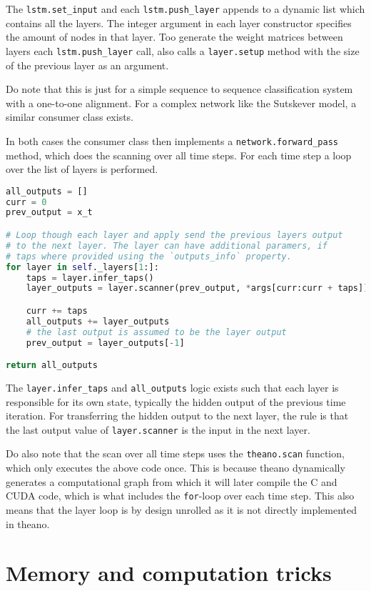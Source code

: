 The \texttt{lstm.set\_input} and each \texttt{lstm.push\_layer} appends to a dynamic list which contains all the layers. The integer argument in each layer constructor specifies the amount of nodes in that layer. Too generate the weight matrices between layers each \texttt{lstm.push\_layer} call, also calls a \texttt{layer.setup} method with the size of the previous layer as an argument.

Do note that this is just for a simple sequence to sequence classification system with a one-to-one alignment. For a complex network like the Sutskever model, a similar consumer class exists.

In both cases the consumer class then implements a \texttt{network.forward\_pass} method, which does the scanning over all time steps. For each time step a loop over the list of layers is performed.
\begin{lstlisting}[language=Python]
all_outputs = []
curr = 0
prev_output = x_t

# Loop though each layer and apply send the previous layers output
# to the next layer. The layer can have additional paramers, if
# taps where provided using the `outputs_info` property.
for layer in self._layers[1:]:
    taps = layer.infer_taps()
    layer_outputs = layer.scanner(prev_output, *args[curr:curr + taps])

    curr += taps
    all_outputs += layer_outputs
    # the last output is assumed to be the layer output
    prev_output = layer_outputs[-1]

return all_outputs
\end{lstlisting}

The \texttt{layer.infer\_taps} and \texttt{all\_outputs} logic exists such that each layer is responsible for its own state, typically the hidden output of the previous time iteration. For transferring the hidden output to the next layer, the rule is that the last output value of \texttt{layer.scanner} is the input in the next layer.

Do also note that the scan over all time steps uses the \texttt{theano.scan} function, which only executes the above code once. This is because theano dynamically generates a computational graph from which it will later compile the C and CUDA code, which is what includes the \texttt{for}-loop over each time step. This also means that the layer loop is by design unrolled as it is not directly implemented in theano.

\section{Memory and computation tricks}


